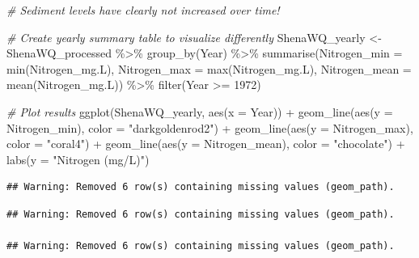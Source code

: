 \documentclass[
  12pt,
]{article}
\newenvironment{Shaded}{\begin{snugshade}}{\end{snugshade}}
\newcommand{\AttributeTok}[1]{\textcolor[rgb]{0.77,0.63,0.00}{#1}}
\newcommand{\CommentTok}[1]{\textcolor[rgb]{0.56,0.35,0.01}{\textit{#1}}}
\newcommand{\DecValTok}[1]{\textcolor[rgb]{0.00,0.00,0.81}{#1}}
\newcommand{\FunctionTok}[1]{\textcolor[rgb]{0.00,0.00,0.00}{#1}}
\newcommand{\NormalTok}[1]{#1}
\newcommand{\OtherTok}[1]{\textcolor[rgb]{0.56,0.35,0.01}{#1}}
\newcommand{\SpecialCharTok}[1]{\textcolor[rgb]{0.00,0.00,0.00}{#1}}
\newcommand{\StringTok}[1]{\textcolor[rgb]{0.31,0.60,0.02}{#1}}
\begin{document}
\begin{Shaded}
\begin{Highlighting}[]
\CommentTok{\# Sediment levels have clearly not increased over time!}

\CommentTok{\# Create yearly summary table to visualize differently}
\NormalTok{ShenaWQ\_yearly }\OtherTok{\textless{}{-}}\NormalTok{ ShenaWQ\_processed }\SpecialCharTok{\%\textgreater{}\%}
  \FunctionTok{group\_by}\NormalTok{(Year) }\SpecialCharTok{\%\textgreater{}\%}
  \FunctionTok{summarise}\NormalTok{(}\AttributeTok{Nitrogen\_min =} \FunctionTok{min}\NormalTok{(Nitrogen\_mg.L),}
            \AttributeTok{Nitrogen\_max =} \FunctionTok{max}\NormalTok{(Nitrogen\_mg.L),}
            \AttributeTok{Nitrogen\_mean =} \FunctionTok{mean}\NormalTok{(Nitrogen\_mg.L)) }\SpecialCharTok{\%\textgreater{}\%}
  \FunctionTok{filter}\NormalTok{(Year }\SpecialCharTok{\textgreater{}=} \DecValTok{1972}\NormalTok{)}

\CommentTok{\# Plot results}
\FunctionTok{ggplot}\NormalTok{(ShenaWQ\_yearly, }\FunctionTok{aes}\NormalTok{(}\AttributeTok{x =}\NormalTok{ Year)) }\SpecialCharTok{+}
  \FunctionTok{geom\_line}\NormalTok{(}\FunctionTok{aes}\NormalTok{(}\AttributeTok{y =}\NormalTok{ Nitrogen\_min), }\AttributeTok{color =} \StringTok{"darkgoldenrod2"}\NormalTok{) }\SpecialCharTok{+}
  \FunctionTok{geom\_line}\NormalTok{(}\FunctionTok{aes}\NormalTok{(}\AttributeTok{y =}\NormalTok{ Nitrogen\_max), }\AttributeTok{color =} \StringTok{"coral4"}\NormalTok{) }\SpecialCharTok{+}
  \FunctionTok{geom\_line}\NormalTok{(}\FunctionTok{aes}\NormalTok{(}\AttributeTok{y =}\NormalTok{ Nitrogen\_mean), }\AttributeTok{color =} \StringTok{"chocolate"}\NormalTok{) }\SpecialCharTok{+}
  \FunctionTok{labs}\NormalTok{(}\AttributeTok{y =} \StringTok{"Nitrogen (mg/L)"}\NormalTok{)}
\end{Highlighting}
\end{Shaded}

\begin{verbatim}
## Warning: Removed 6 row(s) containing missing values (geom_path).
\end{verbatim}

\begin{verbatim}
## Warning: Removed 6 row(s) containing missing values (geom_path).

## Warning: Removed 6 row(s) containing missing values (geom_path).
\end{verbatim}
\end{document}
